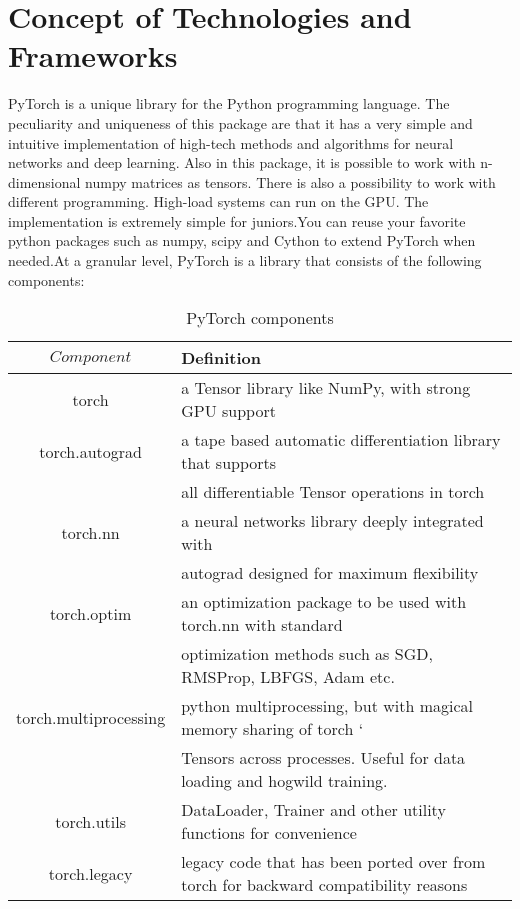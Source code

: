 \section{Concept of Technologies and Frameworks}\label{sec:4.4}
\par PyTorch is a unique library for the Python programming language. The peculiarity and uniqueness of this package are that it has a very simple and intuitive implementation of high-tech methods and algorithms for neural networks and deep learning. Also in this package, it is possible to work with n-dimensional numpy matrices as tensors. There is also a possibility to work with different programming. High-load systems can run on the GPU. The implementation is extremely simple for juniors.You can reuse your favorite python packages such as numpy, scipy and Cython to extend PyTorch when needed.At a granular level, PyTorch is a library that consists of the following components:
\begin{table}[tbp]
	\centering
	\caption{PyTorch components}
	\label{tab:sample11}
	\begin{tabular}{cl}
		\toprule
		$Component$ 			& Definition 																			\\ \midrule
		torch  					& a Tensor library like NumPy, with strong GPU support 									\\
		torch.autograd 			& a tape based automatic differentiation library that supports 							\\ 
		& all differentiable Tensor operations in torch 										\\
		torch.nn  				& a neural networks library deeply integrated with 					 					\\
		& autograd designed for maximum  flexibility 											\\
		torch.optim  			& an optimization package to be used with torch.nn with standard 						\\  
		& optimization  methods such as SGD, RMSProp, LBFGS, Adam etc.							\\
		torch.multiprocessing 	& python multiprocessing, but with magical memory sharing of torch  		`			\\ 
		& Tensors across processes. Useful for data loading and hogwild training. 				\\
		torch.utils  			& DataLoader, Trainer and other utility functions for convenience 						\\
		torch.legacy  			& legacy code that has been ported over from torch for backward compatibility reasons 	\\
		\bottomrule
	\end{tabular}
\end{table}



